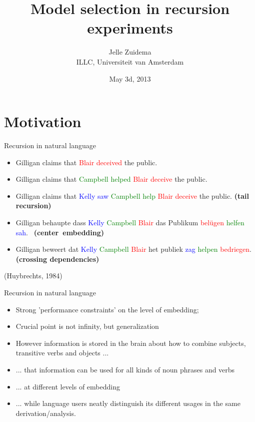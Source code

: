 \documentclass[xcolor=table]{beamer}
\title{Model selection in recursion experiments}
\author{Jelle Zuidema\\ ILLC, Universiteit van Amsterdam}
\date{May 3d, 2013}
\newcommand{\blue}[1]{\textcolor{blue}{#1}}
\newcommand{\red}[1]{\textcolor{red}{#1}}
\newcommand{\green}[1]{\textcolor{green}{#1}}
\begin{document}
\begin{frame}
\titlepage
\end{frame}

\section{Motivation}
\label{sec:motivation}

\begin{frame}{Recursion in natural language}
\begin{itemize}[<+->]
  \item Gilligan claims that \red{Blair deceived} the
    public. 
  \item Gilligan claims that \green{Campbell helped} \red{Blair deceive} the
    public. 
  \item Gilligan claims that \blue{Kelly saw} \green{Campbell help} \red{Blair deceive} the
    public. \hfill \textbf{(tail recursion)}
  \item Gilligan behaupte dass \blue{Kelly} \green{Campbell} \red{Blair} das Publikum \red{bel\"ugen}
    \green{helfen} \blue{sah}. \hfill~\textbf{(center~embedding)}
  \item Gilligan beweert dat \blue{Kelly} \green{Campbell} \red{Blair} het publiek \blue{zag} \green{helpen}
    \red{bedriegen}. \hfill \textbf{(crossing dependencies)}
\end{itemize}
(Huybrechts, 1984)
\end{frame}

\begin{frame}{Recursion in natural language}
  \begin{itemize}[<+->]
  \item Strong 'performance constraints' on the level of embedding;
  \item Crucial point is not infinity, but generalization
  \item However information is stored in the brain about how to
    combine subjects, transitive verbs and objects ...
  \item ... that information can be used for all kinds of noun phrases
    and verbs
  \item ... at different levels of embedding
  \item ... while language users neatly distinguish its different
    usages in the same derivation/analysis.
  \end{itemize}
\end{frame}
\end{document}

